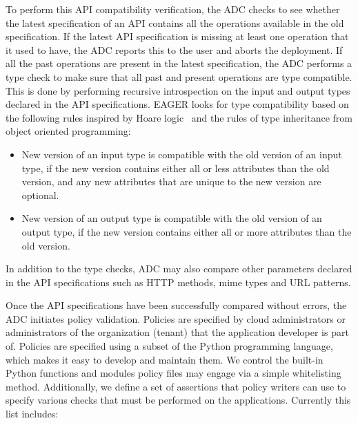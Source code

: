 To perform this API compatibility verification, the ADC checks to see whether the latest specification of an API contains all 
the operations available in the old specification. If the latest API specification is missing at least one operation that it used to have, the ADC
reports this to the user and aborts the deployment. If all the past operations are present in the latest specification, the ADC performs a 
type check to make sure that 
all past and present operations are type compatible. This is done by performing recursive introspection on the input and output types declared in the
API specifications. EAGER looks for type compatibility based on the following rules inspired by Hoare
logic~\cite{Hoare:1969:ABC:363235.363259} and the rules of type inheritance from object oriented programming:
\begin{itemize}
\item New version of an input type is compatible with the old version of an input type, if the new version contains either all or less attributes than the 
old version, and any new attributes that are unique to the new version are optional.
\item New version of an output type is compatible with the old version of an output type, if the new version contains either all or more attributes than the 
old version.
\end{itemize}
In addition to the type checks, ADC may also compare other parameters declared in the API specifications
such as HTTP methods, mime types and URL patterns.


Once the API specifications have been successfully compared without errors, the ADC initiates policy validation. Policies
are specified by cloud administrators or administrators of the organization (tenant) that the application developer is part of. Policies are specified using
a subset of the Python programming language, which makes it easy to develop and maintain them. We control the built-in Python functions and
modules policy files may engage via a simple whitelisting method. Additionally, we define a set of assertions that policy writers can use to specify
various checks that must be performed on the applications. Currently this list includes:

